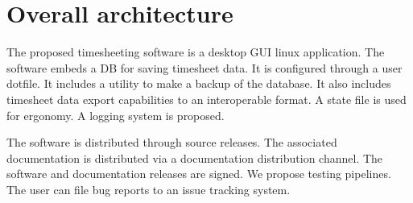 \section{Overall architecture} \label{sec:overall}
The proposed timesheeting software is a desktop \gls{GUI} linux application.
The software embeds a \gls{DB} for saving timesheet data. It is
configured through a user dotfile. It includes a utility to make
a backup of the database. It also includes timesheet data export
capabilities to an interoperable format. A state file is used
for ergonomy. A logging system is proposed.

The software is distributed through source releases. The associated
documentation is distributed via a documentation distribution channel.
The software and documentation releases are signed. We propose
testing pipelines. The user can file bug reports to an issue
tracking system.
